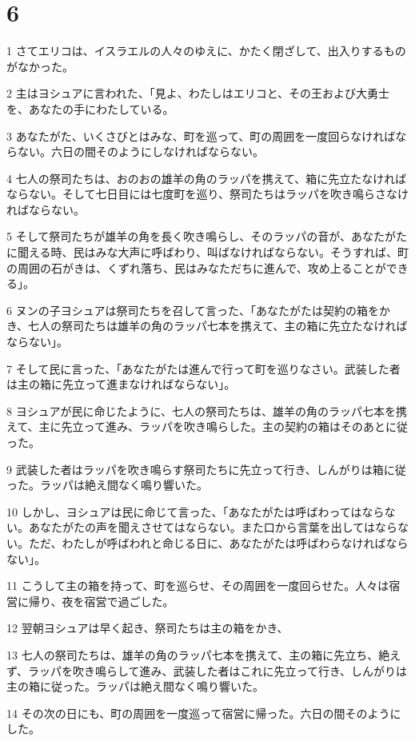 \chapter{6}

\par 1 さてエリコは、イスラエルの人々のゆえに、かたく閉ざして、出入りするものがなかった。
\par 2 主はヨシュアに言われた、「見よ、わたしはエリコと、その王および大勇士を、あなたの手にわたしている。
\par 3 あなたがた、いくさびとはみな、町を巡って、町の周囲を一度回らなければならない。六日の間そのようにしなければならない。
\par 4 七人の祭司たちは、おのおの雄羊の角のラッパを携えて、箱に先立たなければならない。そして七日目には七度町を巡り、祭司たちはラッパを吹き鳴らさなければならない。
\par 5 そして祭司たちが雄羊の角を長く吹き鳴らし、そのラッパの音が、あなたがたに聞える時、民はみな大声に呼ばわり、叫ばなければならない。そうすれば、町の周囲の石がきは、くずれ落ち、民はみなただちに進んで、攻め上ることができる」。
\par 6 ヌンの子ヨシュアは祭司たちを召して言った、「あなたがたは契約の箱をかき、七人の祭司たちは雄羊の角のラッパ七本を携えて、主の箱に先立たなければならない」。
\par 7 そして民に言った、「あなたがたは進んで行って町を巡りなさい。武装した者は主の箱に先立って進まなければならない」。
\par 8 ヨシュアが民に命じたように、七人の祭司たちは、雄羊の角のラッパ七本を携えて、主に先立って進み、ラッパを吹き鳴らした。主の契約の箱はそのあとに従った。
\par 9 武装した者はラッパを吹き鳴らす祭司たちに先立って行き、しんがりは箱に従った。ラッパは絶え間なく鳴り響いた。
\par 10 しかし、ヨシュアは民に命じて言った、「あなたがたは呼ばわってはならない。あなたがたの声を聞えさせてはならない。また口から言葉を出してはならない。ただ、わたしが呼ばわれと命じる日に、あなたがたは呼ばわらなければならない」。
\par 11 こうして主の箱を持って、町を巡らせ、その周囲を一度回らせた。人々は宿営に帰り、夜を宿営で過ごした。
\par 12 翌朝ヨシュアは早く起き、祭司たちは主の箱をかき、
\par 13 七人の祭司たちは、雄羊の角のラッパ七本を携えて、主の箱に先立ち、絶えず、ラッパを吹き鳴らして進み、武装した者はこれに先立って行き、しんがりは主の箱に従った。ラッパは絶え間なく鳴り響いた。
\par 14 その次の日にも、町の周囲を一度巡って宿営に帰った。六日の間そのようにした。
